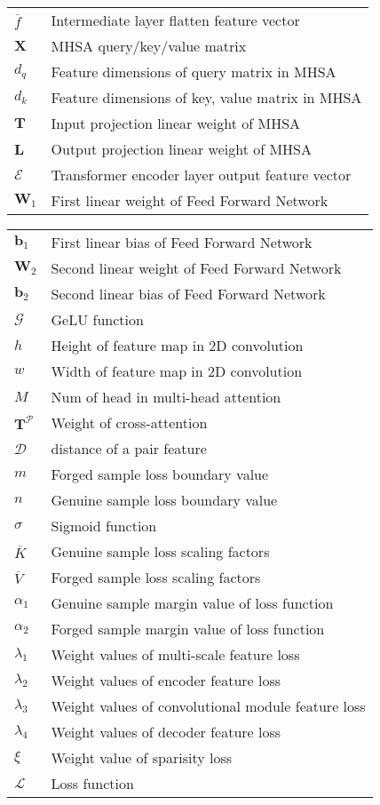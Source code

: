 \begin{tabular}{@{} l @{\hspace{3em}} l @{}}
    $\overline{f}$ & Intermediate layer flatten feature vector \\
    $\boldsymbol{X}$ & MHSA query/key/value matrix \\
    $d_q$ & Feature dimensions of query matrix in MHSA \\
    $d_k$ & Feature dimensions of key, value matrix in MHSA \\
    $\mathbf{T}$ & Input projection linear weight of MHSA \\
    $\mathbf{L}$ & Output projection linear weight of MHSA \\
    $\mathcal{E}$ & Transformer encoder layer output feature vector \\
    $\mathbf{W}_1$ & First linear weight of Feed Forward Network \\
\end{tabular}

\begin{tabular}{@{} l @{\hspace{3em}} l @{}}
    $\mathbf{b}_1$ & First linear bias of Feed Forward Network \\
    $\mathbf{W}_2$ & Second linear weight  of Feed Forward Network \\
    $\mathbf{b}_2$ & Second linear bias of Feed Forward Network \\
    $\mathcal{G}$ & GeLU function \\
    $h$ & Height of feature map in 2D convolution \\
    $w$ & Width of feature map in 2D convolution \\
    $M$ & Num of head in multi-head attention \\
    $\mathbf{T}^\mathcal{P}$ & Weight of cross-attention \\
    $\mathcal{D}$ & distance of a pair feature \\
    $m$ & Forged sample loss boundary value \\
    $n$ & Genuine sample loss boundary value \\
    $\sigma$ & Sigmoid function \\
    $\overline{K}$ & Genuine sample loss scaling factors \\
    $\overline{V}$ & Forged sample loss scaling factors \\
    $\alpha_1$ & Genuine sample margin value of loss function \\
    $\alpha_2$ & Forged sample margin value of loss function \\
    $\lambda_1$ & Weight values of multi-scale feature loss \\
    $\lambda_2$ & Weight values of encoder feature loss \\
    $\lambda_3$ & Weight values of convolutional module feature loss \\
    $\lambda_4$ & Weight values of decoder feature loss \\
    $\xi$ & Weight value of sparisity loss \\
    $\mathcal{L}$ & Loss function \\
\end{tabular}
